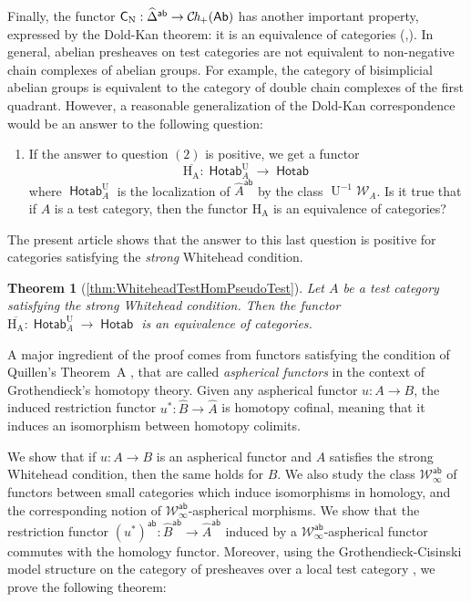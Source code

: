 \documentclass[10pt, english, a4paper, nothms]{amsart}
\theoremstyle{plain}
\newtheorem*{theorem*}{Theorem}
\theoremstyle{remark}
\theoremstyle{definition}
\numberwithin{equation}{theorem}
\newcommand{\Ch}{{\mathcal{C}\mspace{-2.mu}\it{h}_{+}}}
\newcommand{\pref}[1]{{\widehat{ #1 }}}
\newcommand{\W}{\mathcal{W}}
\newcommand{\Hotab}{\operatorname{\mathsf{Hotab}}}
\newcommand{\Ab}{{\mathsf{Ab}}}
\newcommand{\ab}{{\mathsf{ab}}}
\newcommand{\Hf}[1]{\operatorname{H_{#1}}}
\newcommand{\prefab}[1]{\widehat{ #1 }^{\mathsf{ab}}}
\newcommand{\Wab}{\W^{\ab}}
\DeclareMathOperator{\U}{U}
\DeclareMathOperator{\dk}{\mathsf{C}_N}
\begin{document}
Finally, the functor $\dk : \prefab{\Delta}\to\Ch(\Ab)$ has another important
property, expressed by the Dold-Kan theorem: it is an equivalence of categories
(\cite{dold1958homology},\cite{kan1958functors}). 
In general, abelian presheaves on test categories are not equivalent to
non-negative chain complexes of abelian groups. 
For example, the category of bisimplicial abelian groups is equivalent to the
category of double chain complexes of the first quadrant.
However, a reasonable generalization of the Dold-Kan correspondence would be an
answer to the following question:
\begin{enumerate}[resume]
\item If the answer to question $(2)$ is positive, we get a functor 
\[
\overline{\Hf{A}} : \Hotab_A^{\U} \to \Hotab
\]
where $\Hotab_A^{\U}$ is the localization of $\prefab{A}$ by the class
$\U^{-1}\W_A$.
Is it true that if $A$ is a test category, then the functor $\Hf{A}$ is an
equivalence of categories? 
\end{enumerate}

The present article shows that the answer to this last question is positive for
categories satisfying the \emph{strong} Whitehead condition.

\begin{theorem*}[\ref{thm:WhiteheadTestHomPseudoTest}]
Let $A$ be a test category satisfying the strong Whitehead condition. 
Then the functor $\overline{\Hf{A}} : \Hotab_A^{\U} \to \Hotab$ is an
equivalence of categories. 
\end{theorem*}

A major ingredient of the proof comes from functors satisfying the condition of
Quillen's Theorem~A \cite[Theorem A]{quillenktheory}, that are called
\emph{aspherical functors} in the context of Grothendieck's homotopy theory.
Given any aspherical functor $u : A \to B$, the induced restriction functor $u^*
: \pref{B}\to\pref{A}$ is homotopy cofinal, meaning that it induces an
isomorphism between homotopy colimits.

We show that if $u : A \to B$ is an aspherical functor and $A$ satisfies the
strong Whitehead condition, then the same holds for $B$. We also study the class
$\Wab_\infty$ of functors between small categories which induce isomorphisms in
homology, and the corresponding notion of $\Wab_\infty$-aspherical morphisms.
We show that the restriction functor $(u^*)^\ab : \prefab{B}\to\prefab{A}$
induced by a $\Wab_\infty$-aspherical functor commutes with the homology
functor. Moreover, using the Grothendieck-Cisinski model structure on the
category of presheaves over a local test category
\cite[Corollary~4.2.18]{cisinskipref}, we prove the following theorem:
\end{document}
